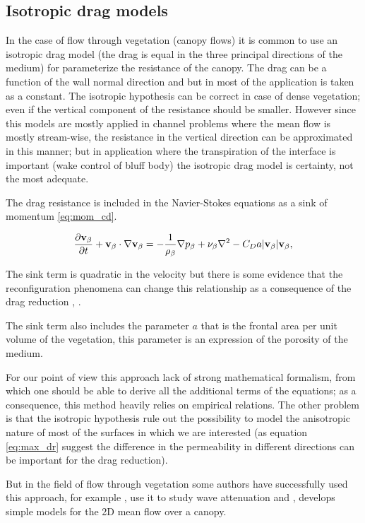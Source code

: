 \subsection{Isotropic drag models}
\label{sec:canopy_eq}

In the case of flow through vegetation (canopy flows) it is common to use an isotropic drag model (the drag is equal in the three principal directions of the medium) for parameterize the resistance of the canopy.
The drag can be a function of the wall normal direction and but in most of the application is taken as a constant.
The isotropic hypothesis can be correct in case of dense vegetation; even if the vertical component of the resistance should be smaller.
However since this models are mostly applied in channel problems where the mean flow is mostly stream-wise, the resistance in the vertical direction can be approximated in this manner; but in application where the transpiration of the interface is important (wake control of bluff body) the isotropic drag model is certainty, not the most adequate.

The drag resistance is included in the Navier-Stokes equations as a sink of momentum \eqref{eq:mom_cd}.

\begin{equation}
\frac{\partial \textbf{v}_{\beta}}{\partial t} + \textbf{v}_{\beta} \cdot \nabla \textbf{v}_{\beta} = -\frac{1}{\rho_{\beta}} \nabla p_{\beta} + \nu_{\beta} \nabla^2 -C_D a |\textbf{v}_{\beta}| \textbf{v}_{\beta}, 
\label{eq:mom_cd}
\end{equation}

The sink term is quadratic in the velocity but there is some evidence that the reconfiguration phenomena can change this relationship as a consequence of the drag reduction \citet{gosselin2011drag}, \citet{alvarado2017nature}.

The sink term also includes the parameter $a$ that is the frontal area per unit volume of the vegetation, this parameter is an expression of the porosity of the medium.

For our point of view this approach lack of strong mathematical formalism, from which one should be able to derive all the additional terms of the equations; as a consequence, this method heavily relies on empirical relations.
The other problem is that the isotropic hypothesis rule out the possibility to model the anisotropic nature of most of the surfaces in which we are interested (as equation \eqref{eq:max_dr} suggest the difference in the permeability in different directions can be important for the drag reduction).

But in the field of flow through vegetation some authors have successfully used this approach, for example \citet{maza2013coupled}, \citet{maza2015tsunami} use it to study wave attenuation and \citet{ghisalberti2004limited}, \citet{battiato2014single} develops simple models for the 2D mean flow over a canopy.


